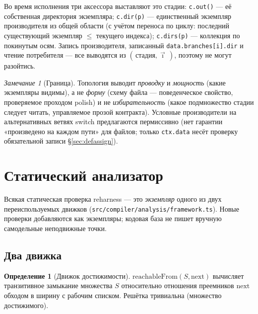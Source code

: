 \documentclass[11pt]{article}
\theoremstyle{plain}
\theoremstyle{definition}
\newtheorem{definition}[theorem]{Определение}
\theoremstyle{remark}
\newtheorem{remark}[theorem]{Замечание}
\newcommand{\reharness}{\textsf{reharness}}
\newcommand{\code}[1]{\texttt{#1}}
\newcommand{\state}[1]{\textsf{#1}}
\begin{document}
Во время исполнения три аксессора выставляют это стадии: \code{c.out()} --- её
собственная директория экземпляра; \code{c.dir(p)} --- единственный экземпляр
производителя из общей области (с учётом переноса по циклу: последний существующий
экземпляр $\le$ текущего индекса); \code{c.dirs(p)} --- коллекция по покинутым осям.
Запись производителя, записанный \code{data.branches[i].dir} и чтение потребителя --- все
выводятся из $(\,\text{стадия}, \vec{\imath}\,)$, поэтому не могут разойтись.

\begin{remark}[Граница]
Топология выводит \emph{проводку} и \emph{мощность} (какие экземпляры видимы), а не
\emph{форму} (схему файла --- поведенческое свойство, проверяемое проходом \state{polish})
и не \emph{избирательность} (какое подмножество стадии следует читать, управляемое прозой
контракта). Условные производители на альтернативных ветвях \state{switch} предлагаются
пермиссивно (нет гарантии «произведено на каждом пути» для файлов; только \code{ctx.data}
несёт проверку обязательной записи \S\ref{sec:defassign}).
\end{remark}

\section{Статический анализатор}\label{sec:compiler-analysis}

Всякая статическая проверка \reharness{} --- это \emph{экземпляр} одного из двух
переиспользуемых движков (\code{src/compiler/analysis/framework.ts}). Новые проверки
добавляются как экземпляры; кодовая база не пишет вручную самодельные неподвижные точки.

\subsection{Два движка}\label{sec:engines}

\begin{definition}[Движок достижимости]
$\mathrm{reachableFrom}(S, \mathrm{next})$ вычисляет транзитивное замыкание множества $S$
относительно отношения преемников $\mathrm{next}$ обходом в ширину с рабочим списком.
Решётка тривиальна (множество достижимого).
\end{definition}
\end{document}
